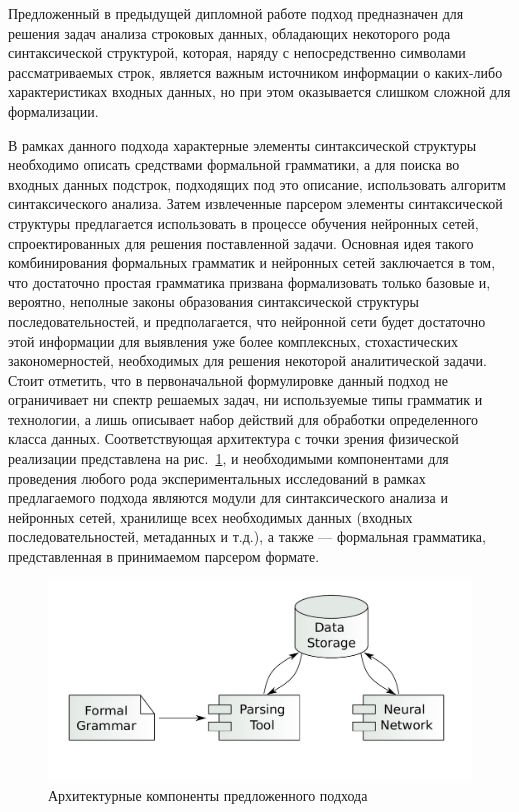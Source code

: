 Предложенный в предыдущей дипломной работе подход предназначен для решения задач анализа строковых данных, обладающих некоторого рода синтаксической структурой, которая, наряду с непосредственно символами рассматриваемых строк, является важным источником информации о каких-либо характеристиках входных данных, но при этом оказывается слишком сложной для формализации.

В рамках данного подхода характерные элементы синтаксической структуры необходимо описать средствами формальной грамматики, а для поиска во входных данных подстрок, подходящих под это описание, использовать алгоритм синтаксического анализа. Затем извлеченные парсером элементы синтаксической структуры предлагается использовать в процессе обучения нейронных сетей, спроектированных для решения поставленной задачи. Основная идея такого комбинирования формальных грамматик и нейронных сетей заключается в том, что достаточно простая грамматика призвана формализовать только базовые и, вероятно, неполные законы образования синтаксической структуры последовательностей, и предполагается, что нейронной сети будет достаточно этой информации для выявления уже более комплексных, стохастических закономерностей, необходимых для решения некоторой аналитической задачи. Стоит отметить, что в первоначальной формулировке данный подход не ограничивает ни спектр решаемых задач, ни используемые типы грамматик и технологии, а лишь описывает набор действий для обработки определенного класса данных. Соответствующая архитектура с точки зрения физической реализации представлена на рис.~\ref{diagram}, и необходимыми компонентами для проведения любого рода экспериментальных исследований в рамках предлагаемого подхода являются модули для синтаксического анализа и нейронных сетей, хранилище всех необходимых данных (входных последовательностей, метаданных и т.д.), а также --- формальная грамматика, представленная в принимаемом парсером формате.

\vspace{5mm}
\begin{figure}[h]
\begin{center}
\centering
\includegraphics[width=12.0cm]{pics/diagram.pdf}
\caption{Архитектурные компоненты предложенного подхода}
\label{diagram}
\end{center}
\end{figure} 

